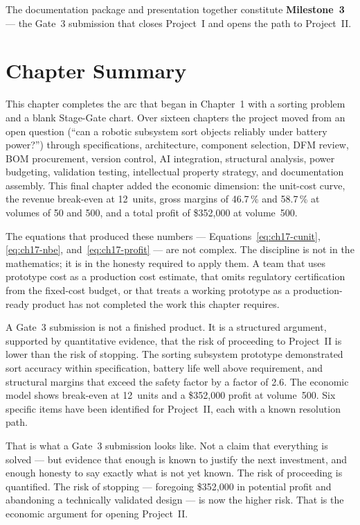 The documentation package and presentation together constitute
\textbf{Milestone~3} --- the Gate~3 submission that
closes Project~I and opens the path to Project~II.

\section*{Chapter Summary}
\label{sec:ch17-summary}

This chapter completes the arc that began in Chapter~1 with a sorting
problem and a blank Stage-Gate chart.
Over sixteen chapters the project moved from an open question (``can a
robotic subsystem sort objects reliably under battery power?'') through
specifications, architecture, component selection, DFM review, BOM
procurement, version control, AI integration, structural analysis,
power budgeting, validation testing, intellectual property strategy, and
documentation assembly.
This final chapter added the economic dimension: the unit-cost curve,
the revenue break-even at 12~units, gross margins of 46.7\,\% and 58.7\,\%
at volumes of 50 and 500, and a total profit of \$352,000 at volume~500.

The equations that produced these numbers --- Equations~\ref{eq:ch17-cunit},
\ref{eq:ch17-nbe}, and~\ref{eq:ch17-profit} --- are not complex.
The discipline is not in the mathematics; it is in the honesty required to
apply them.
A team that uses prototype cost as a production cost estimate, that omits
regulatory certification from the fixed-cost budget, or that treats a
working prototype as a production-ready product has not completed the work
this chapter requires.

A Gate~3 submission is not a finished product.
It is a structured argument, supported by quantitative evidence, that the
risk of proceeding to Project~II is lower than the risk of stopping.
The sorting subsystem prototype demonstrated sort accuracy within
specification, battery life well above requirement, and structural margins
that exceed the safety factor by a factor of 2.6.
The economic model shows break-even at 12~units and a \$352,000 profit at
volume~500.
Six specific items have been identified for Project~II, each with a known
resolution path.

That is what a Gate~3 submission looks like.
Not a claim that everything is solved --- but evidence that enough is known
to justify the next investment, and enough honesty to say exactly what
is not yet known.
The risk of proceeding is quantified.
The risk of stopping --- foregoing \$352,000 in potential profit and
abandoning a technically validated design --- is now the higher risk.
That is the economic argument for opening Project~II.
